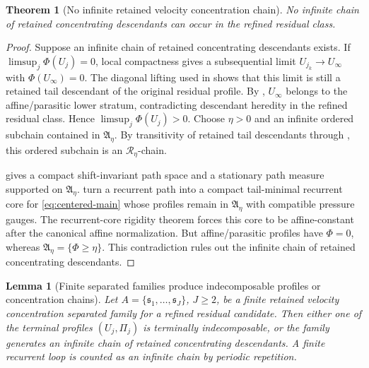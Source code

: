 \documentclass[11pt]{amsart}
\numberwithin{equation}{section}
\theoremstyle{plain}
\newtheorem{theorem}{Theorem}[section]
\newtheorem{lemma}[lemma]{Lemma}
\theoremstyle{definition}
\theoremstyle{remark}
\begin{document}
\begin{theorem}[No infinite retained velocity concentration chain]
\label{thm:compact-active-descendant}
No infinite chain of retained concentrating descendants can occur in the refined residual
class.
\end{theorem}

\begin{proof}
Suppose an infinite chain of retained concentrating descendants exists.  If
\(\limsup_j\Phi(U_j)=0\), local compactness gives a subsequential limit
\(U_{j_k}\to U_\infty\) with \(\Phi(U_\infty)=0\).  The diagonal lifting used in
 shows that this limit is still a
retained tail descendant of the original residual profile.  By
, \(U_\infty\) belongs to the
affine/parasitic lower stratum, contradicting descendant heredity in the
refined residual class.  Hence \(\limsup_j\Phi(U_j)>0\).  Choose
\(\eta>0\) and an infinite ordered subchain contained in \(\mathfrak A_\eta\).
By transitivity of retained tail descendants through
, this ordered subchain is an
\(\mathcal R_\eta\)-chain.

 gives a compact shift-invariant path
space and a stationary path measure supported on \(\mathfrak A_\eta\).
turn a recurrent path into a compact tail-minimal recurrent core for
\eqref{eq:centered-main} whose profiles remain in \(\mathfrak A_\eta\) with
compatible pressure gauges.  The recurrent-core rigidity theorem
 forces this core to be affine-constant
after the canonical affine normalization.  But affine/parasitic profiles have
\(\Phi=0\), whereas \(\mathfrak A_\eta=\{\Phi\ge\eta\}\).  This contradiction
rules out the infinite chain of retained concentrating descendants.
\end{proof}

\begin{lemma}[Finite separated families produce indecomposable profiles or concentration chains]
\label{lem:finite-graph-cycle}
Let \(A=\{\mathfrak s_1,\dots,\mathfrak s_J\}\), \(J\ge2\), be a finite
retained velocity concentration separated family for a refined residual candidate.  Then either one of
the terminal profiles \((U_j,\Pi_j)\) is terminally indecomposable, or the
family generates an infinite chain of retained concentrating descendants.  A finite recurrent loop
is counted as an infinite chain by periodic repetition.
\end{lemma}
\end{document}
